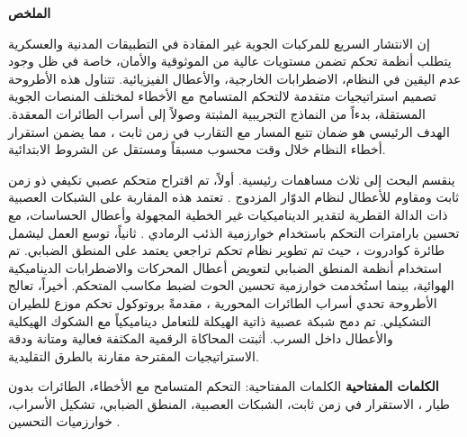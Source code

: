 \vspace{6pt}
\begin{RLtext}\small

\textbf{الملخص}

إن الانتشار السريع للمركبات الجوية غير المقادة  في التطبيقات المدنية والعسكرية يتطلب أنظمة تحكم تضمن مستويات عالية من الموثوقية والأمان، خاصة في ظل وجود عدم اليقين في النظام، الاضطرابات الخارجية، والأعطال الفيزيائية. تتناول هذه الأطروحة تصميم استراتيجيات متقدمة لالتحكم المتسامح مع الأخطاء  لمختلف المنصات الجوية المستقلة، بدءاً من النماذج التجريبية المثبتة وصولاً إلى أسراب الطائرات المعقدة. الهدف الرئيسي هو ضمان تتبع المسار مع التقارب في زمن ثابت ، مما يضمن استقرار أخطاء النظام خلال وقت محسوب مسبقاً ومستقل عن الشروط الابتدائية.

ينقسم البحث إلى ثلاث مساهمات رئيسية. أولاً، تم اقتراح متحكم عصبي تكيفي ذو زمن ثابت ومقاوم للأعطال لنظام الدوّار المزدوج . تعتمد هذه المقاربة على الشبكات العصبية ذات الدالة القطرية  لتقدير الديناميكيات غير الخطية المجهولة وأعطال الحساسات، مع تحسين بارامترات التحكم باستخدام خوارزمية الذئب الرمادي . ثانياً، توسع العمل ليشمل طائرة كوادروت ، حيث تم تطوير نظام تحكم تراجعي  يعتمد على المنطق الضبابي. تم استخدام أنظمة المنطق الضبابي  لتعويض أعطال المحركات والاضطرابات الديناميكية الهوائية، بينما استُخدمت خوارزمية تحسين الحوت  لضبط مكاسب المتحكم. أخيراً، تعالج الأطروحة تحدي أسراب الطائرات المحورية ، مقدمةً بروتوكول تحكم موزع للطيران التشكيلي. تم دمج شبكة عصبية ذاتية الهيكلة  للتعامل ديناميكياً مع الشكوك الهيكلية والأعطال داخل السرب. أثبتت المحاكاة الرقمية المكثفة فعالية ومتانة ودقة الاستراتيجيات المقترحة مقارنة بالطرق التقليدية.

\textbf{الكلمات المفتاحية}
الكلمات المفتاحية: التحكم المتسامح مع الأخطاء، الطائرات بدون طيار ، الاستقرار في زمن ثابت، الشبكات العصبية، المنطق الضبابي، تشكيل الأسراب، خوارزميات التحسين .

\end{RLtext}
